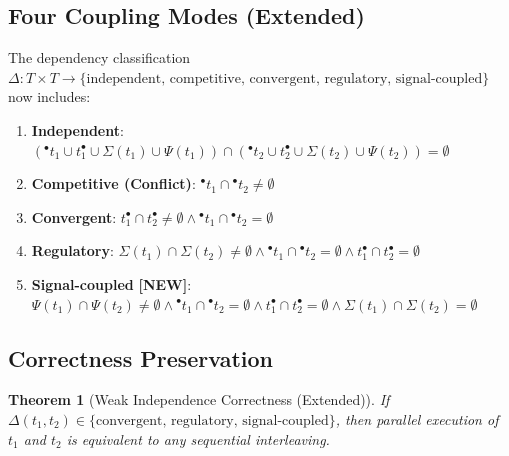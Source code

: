 \documentclass[11pt]{article}
\newtheorem{theorem}{Theorem}
\newcommand{\preset}[1]{{\ensuremath{^{\bullet}#1}}}
\newcommand{\postset}[1]{{\ensuremath{#1^{\bullet}}}}
\newcommand{\RegSet}[1]{{\Sigma(#1)}}
\newcommand{\SignalSet}[1]{{\Psi(#1)}}
\newcommand{\DepType}[2]{{\Delta(#1,#2)}}
\begin{document}
\subsection{Four Coupling Modes (Extended)}

The dependency classification $\Delta: T \times T \to \{\text{independent, competitive, convergent, regulatory, signal-coupled}\}$ now includes:

\begin{enumerate}
    \item \textbf{Independent}: $(\preset{t_1} \cup \postset{t_1} \cup \RegSet{t_1} \cup \SignalSet{t_1}) \cap (\preset{t_2} \cup \postset{t_2} \cup \RegSet{t_2} \cup \SignalSet{t_2}) = \emptyset$
    
    \item \textbf{Competitive (Conflict)}: $\preset{t_1} \cap \preset{t_2} \neq \emptyset$
    
    \item \textbf{Convergent}: $\postset{t_1} \cap \postset{t_2} \neq \emptyset \land \preset{t_1} \cap \preset{t_2} = \emptyset$
    
    \item \textbf{Regulatory}: $\RegSet{t_1} \cap \RegSet{t_2} \neq \emptyset \land \preset{t_1} \cap \preset{t_2} = \emptyset \land \postset{t_1} \cap \postset{t_2} = \emptyset$
    
    \item \textbf{Signal-coupled} \textbf{[NEW]}: $\SignalSet{t_1} \cap \SignalSet{t_2} \neq \emptyset \land \preset{t_1} \cap \preset{t_2} = \emptyset \land \postset{t_1} \cap \postset{t_2} = \emptyset \land \RegSet{t_1} \cap \RegSet{t_2} = \emptyset$
\end{enumerate}

\subsection{Correctness Preservation}

\begin{theorem}[Weak Independence Correctness (Extended)]
If $\DepType{t_1}{t_2} \in \{\text{convergent, regulatory, signal-coupled}\}$, then parallel execution of $t_1$ and $t_2$ is equivalent to any sequential interleaving.
\end{theorem}
\end{document}
